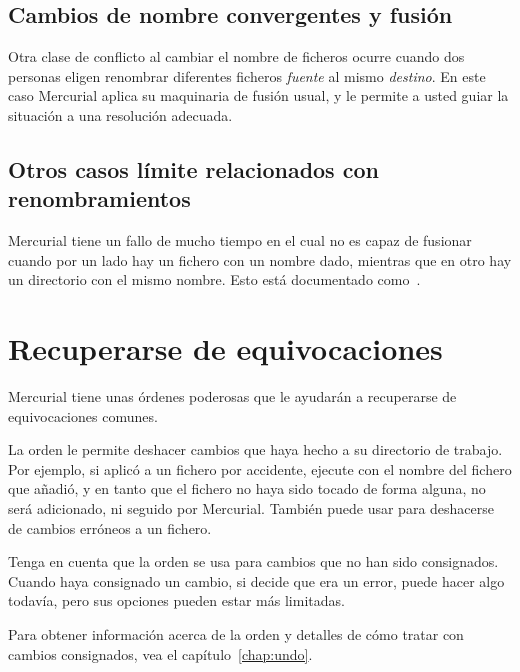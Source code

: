 \subsection{Cambios de nombre convergentes y fusión}

Otra clase de conflicto al cambiar el nombre de ficheros ocurre cuando dos
personas eligen renombrar diferentes ficheros \emph{fuente} al mismo
\emph{destino}. En este caso Mercurial aplica su maquinaria de fusión
usual, y le permite a usted guiar la situación a una resolución adecuada.

\subsection{Otros casos límite relacionados con renombramientos}

Mercurial tiene un fallo de mucho tiempo en el cual no es capaz de
fusionar cuando por un lado hay un fichero con un nombre dado,
mientras que en otro hay un directorio con el mismo nombre. Esto está
documentado como~.

\section{Recuperarse de equivocaciones}

Mercurial tiene unas órdenes poderosas que le ayudarán a recuperarse
de equivocaciones comunes.

La orden  le permite deshacer cambios que haya hecho a
su directorio de trabajo. Por ejemplo, si aplicó  a un
fichero por accidente, ejecute  con el nombre del
fichero que añadió, y en tanto que el fichero no haya sido tocado de
forma alguna, no será adicionado, ni seguido por Mercurial.  También
puede usar  para deshacerse de cambios erróneos a un
fichero.

Tenga en cuenta que la orden  se usa para cambios que no
han sido consignados. Cuando haya consignado un cambio, si decide que
era un error, puede hacer algo todavía, pero sus opciones pueden estar
más limitadas.

Para obtener información acerca de la orden  y detalles
de cómo tratar con cambios consignados, vea el capítulo~\ref{chap:undo}.

